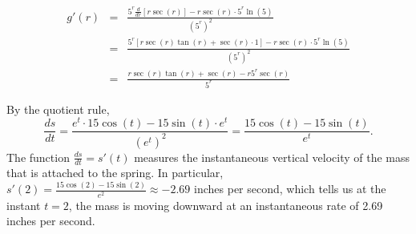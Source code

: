 \begin{activitySolution}
        \begin{eqnarray*}
        g'(r) & = & \frac{5^r \frac{d}{dr}[r \sec(r)] - r\sec(r) \cdot 5^r \ln(5) }{(5^r)^2}\\
      		& = & \frac{5^r [r \sec(r) \tan(r) + \sec(r) \cdot 1] - r\sec(r) \cdot 5^r \ln(5) }{(5^r)^2}\\
		& = & \frac{r \sec(r) \tan(r) + \sec(r) - r 5^r \sec(r)}{5^r}
	\end{eqnarray*}
        \item By the quotient rule, 
        $$\frac{ds}{dt} = \frac{e^t \cdot 15 \cos(t) - 15\sin(t) \cdot e^t}{(e^t)^2} = \frac{15\cos(t) - 15\sin(t)}{e^t}.$$
The function $\frac{ds}{dt} = s'(t)$ measures the instantaneous vertical velocity of the mass that is attached to the spring.  In particular, $s'(2) = \frac{15\cos(2) - 15\sin(2)}{e^2} \approx -2.69$ inches per second, which tells us at the instant $t = 2$, the mass is moving downward at an instantaneous rate of 2.69 inches per second.
\ea
\end{activitySolution}
\aftera